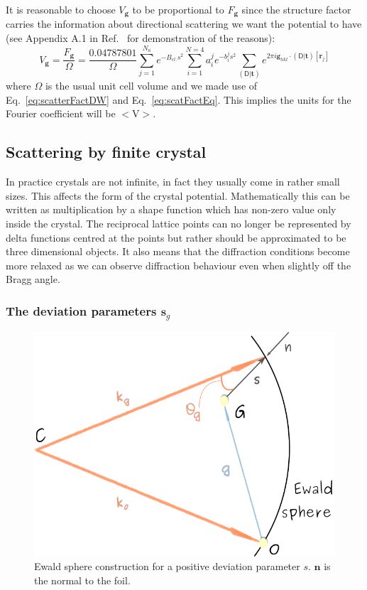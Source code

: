 It is reasonable to choose $V_\mathbf{g}$ to be proportional to $F_\mathbf{g}$ since the structure factor carries the information about directional scattering we want the potential to have (see Appendix A.1 in Ref.~\cite{Rymer70} for demonstration of the reasons):
\begin{equation}
\label{eq:Vg}
    V_\mathbf{g} = \frac{F_\mathbf{g}}{\Omega} = \frac{0.04787801}{\Omega} \sum_{j=1}^{N_a}  e^{-B_{el.} s^2} \sum_{i=1}^{N=4} a^j_i e^{-b^j_i s^2}    \sum_{(\mathsf{D}|\mathbf{t})} e^{2\pi i  \mathbf{g}_{hkl} \cdot (\mathsf{D}|\mathbf{t})[\mathbf{r}_j] }
\end{equation}
 where $\Omega$ is the usual unit cell volume and we made use of Eq.~\ref{eq:scatterFactDW} and Eq.~\ref{eq:scatFactEq}. This implies the units for the Fourier coefficient will be $<$\si{\volt}$>$.
 

\subsection{Scattering by finite crystal}

In practice crystals are not infinite, in fact they usually come in rather small sizes. This affects the form of the crystal potential. Mathematically this can be written as multiplication by a shape function which has non-zero value only inside the crystal. The reciprocal lattice points can no longer be represented by delta functions centred at the points but rather should be approximated to be three dimensional objects.  It also means that the diffraction conditions become more relaxed as we can observe diffraction behaviour even when slightly off the Bragg angle.


\subsubsection{The deviation parameters \texorpdfstring{$\mathbf{s}_g$}{sg}}
\label{sec:sg}

\begin{figure}[ht]
    \centering
\includegraphics[width=0.52\linewidth]{Figures/EwaldSpheresg.png}
\caption[Ewald sphere construction for a positive deviation parameter $s_g$.]{Ewald sphere construction for a positive deviation parameter $s$. $\mathbf{n}$ is the normal to the foil. }
\label{Fig:Ewaldsg}
\end{figure}

